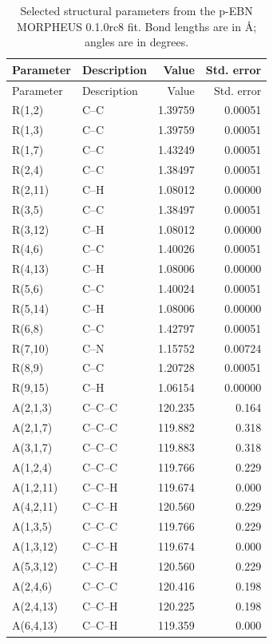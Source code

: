\begin{longtable}{llrr}
\caption{Selected structural parameters from the p-EBN MORPHEUS 0.1.0rc8 fit. Bond lengths are in \AA; angles are in degrees.}\label{tab:si-p-ebn-geometry}\\
\toprule
Parameter & Description & Value & Std. error \\
\midrule
\endfirsthead
\toprule
Parameter & Description & Value & Std. error \\
\midrule
\endhead
R(1,2) & C--C & 1.39759 & 0.00051 \\
R(1,3) & C--C & 1.39759 & 0.00051 \\
R(1,7) & C--C & 1.43249 & 0.00051 \\
R(2,4) & C--C & 1.38497 & 0.00051 \\
R(2,11) & C--H & 1.08012 & 0.00000 \\
R(3,5) & C--C & 1.38497 & 0.00051 \\
R(3,12) & C--H & 1.08012 & 0.00000 \\
R(4,6) & C--C & 1.40026 & 0.00051 \\
R(4,13) & C--H & 1.08006 & 0.00000 \\
R(5,6) & C--C & 1.40024 & 0.00051 \\
R(5,14) & C--H & 1.08006 & 0.00000 \\
R(6,8) & C--C & 1.42797 & 0.00051 \\
R(7,10) & C--N & 1.15752 & 0.00724 \\
R(8,9) & C--C & 1.20728 & 0.00051 \\
R(9,15) & C--H & 1.06154 & 0.00000 \\
A(2,1,3) & C--C--C & 120.235 & 0.164 \\
A(2,1,7) & C--C--C & 119.882 & 0.318 \\
A(3,1,7) & C--C--C & 119.883 & 0.318 \\
A(1,2,4) & C--C--C & 119.766 & 0.229 \\
A(1,2,11) & C--C--H & 119.674 & 0.000 \\
A(4,2,11) & C--C--H & 120.560 & 0.229 \\
A(1,3,5) & C--C--C & 119.766 & 0.229 \\
A(1,3,12) & C--C--H & 119.674 & 0.000 \\
A(5,3,12) & C--C--H & 120.560 & 0.229 \\
A(2,4,6) & C--C--C & 120.416 & 0.198 \\
A(2,4,13) & C--C--H & 120.225 & 0.198 \\
A(6,4,13) & C--C--H & 119.359 & 0.000 \\

\end{longtable}
